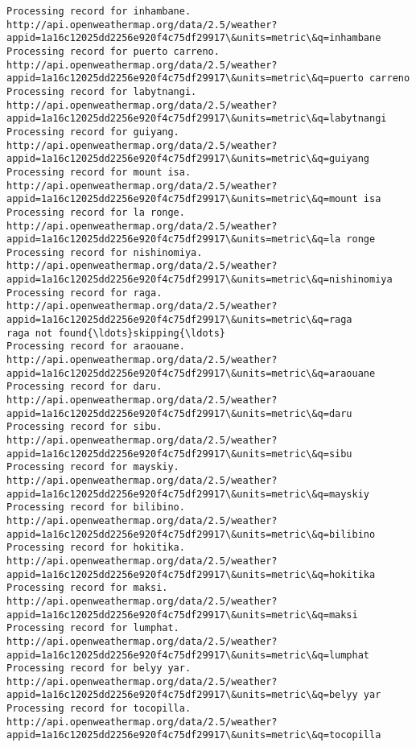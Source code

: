 \documentclass[11pt]{article}
\begin{document}
\begin{Verbatim}[commandchars=\\\{\}]
Processing record for inhambane.
http://api.openweathermap.org/data/2.5/weather?appid=1a16c12025dd2256e920f4c75df29917\&units=metric\&q=inhambane
Processing record for puerto carreno.
http://api.openweathermap.org/data/2.5/weather?appid=1a16c12025dd2256e920f4c75df29917\&units=metric\&q=puerto carreno
Processing record for labytnangi.
http://api.openweathermap.org/data/2.5/weather?appid=1a16c12025dd2256e920f4c75df29917\&units=metric\&q=labytnangi
Processing record for guiyang.
http://api.openweathermap.org/data/2.5/weather?appid=1a16c12025dd2256e920f4c75df29917\&units=metric\&q=guiyang
Processing record for mount isa.
http://api.openweathermap.org/data/2.5/weather?appid=1a16c12025dd2256e920f4c75df29917\&units=metric\&q=mount isa
Processing record for la ronge.
http://api.openweathermap.org/data/2.5/weather?appid=1a16c12025dd2256e920f4c75df29917\&units=metric\&q=la ronge
Processing record for nishinomiya.
http://api.openweathermap.org/data/2.5/weather?appid=1a16c12025dd2256e920f4c75df29917\&units=metric\&q=nishinomiya
Processing record for raga.
http://api.openweathermap.org/data/2.5/weather?appid=1a16c12025dd2256e920f4c75df29917\&units=metric\&q=raga
raga not found{\ldots}skipping{\ldots}
Processing record for araouane.
http://api.openweathermap.org/data/2.5/weather?appid=1a16c12025dd2256e920f4c75df29917\&units=metric\&q=araouane
Processing record for daru.
http://api.openweathermap.org/data/2.5/weather?appid=1a16c12025dd2256e920f4c75df29917\&units=metric\&q=daru
Processing record for sibu.
http://api.openweathermap.org/data/2.5/weather?appid=1a16c12025dd2256e920f4c75df29917\&units=metric\&q=sibu
Processing record for mayskiy.
http://api.openweathermap.org/data/2.5/weather?appid=1a16c12025dd2256e920f4c75df29917\&units=metric\&q=mayskiy
Processing record for bilibino.
http://api.openweathermap.org/data/2.5/weather?appid=1a16c12025dd2256e920f4c75df29917\&units=metric\&q=bilibino
Processing record for hokitika.
http://api.openweathermap.org/data/2.5/weather?appid=1a16c12025dd2256e920f4c75df29917\&units=metric\&q=hokitika
Processing record for maksi.
http://api.openweathermap.org/data/2.5/weather?appid=1a16c12025dd2256e920f4c75df29917\&units=metric\&q=maksi
Processing record for lumphat.
http://api.openweathermap.org/data/2.5/weather?appid=1a16c12025dd2256e920f4c75df29917\&units=metric\&q=lumphat
Processing record for belyy yar.
http://api.openweathermap.org/data/2.5/weather?appid=1a16c12025dd2256e920f4c75df29917\&units=metric\&q=belyy yar
Processing record for tocopilla.
http://api.openweathermap.org/data/2.5/weather?appid=1a16c12025dd2256e920f4c75df29917\&units=metric\&q=tocopilla

\end{Verbatim}
\end{document}
